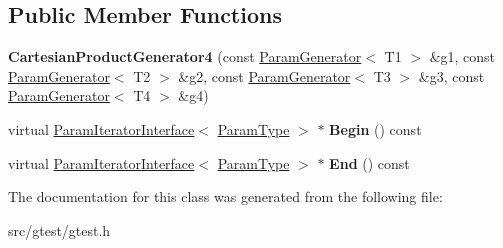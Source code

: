 \subsection*{Public Member Functions}
\begin{DoxyCompactItemize}
\item 
\mbox{\label{classtesting_1_1internal_1_1_cartesian_product_generator4_a4e4512b35f0d71f7a718ded6fe829296}} 
{\bfseries Cartesian\+Product\+Generator4} (const \mbox{\hyperlink{classtesting_1_1internal_1_1_param_generator}{Param\+Generator}}$<$ T1 $>$ \&g1, const \mbox{\hyperlink{classtesting_1_1internal_1_1_param_generator}{Param\+Generator}}$<$ T2 $>$ \&g2, const \mbox{\hyperlink{classtesting_1_1internal_1_1_param_generator}{Param\+Generator}}$<$ T3 $>$ \&g3, const \mbox{\hyperlink{classtesting_1_1internal_1_1_param_generator}{Param\+Generator}}$<$ T4 $>$ \&g4)
\item 
\mbox{\label{classtesting_1_1internal_1_1_cartesian_product_generator4_a2d47d5c0544eeaaff895ba41f825ae3f}} 
virtual \mbox{\hyperlink{classtesting_1_1internal_1_1_param_iterator_interface}{Param\+Iterator\+Interface}}$<$ \mbox{\hyperlink{classstd_1_1tr1_1_1tuple}{Param\+Type}} $>$ $\ast$ {\bfseries Begin} () const
\item 
\mbox{\label{classtesting_1_1internal_1_1_cartesian_product_generator4_a77f18e56a5a9271a1b3b0dff381a5bd3}} 
virtual \mbox{\hyperlink{classtesting_1_1internal_1_1_param_iterator_interface}{Param\+Iterator\+Interface}}$<$ \mbox{\hyperlink{classstd_1_1tr1_1_1tuple}{Param\+Type}} $>$ $\ast$ {\bfseries End} () const
\end{DoxyCompactItemize}


The documentation for this class was generated from the following file\+:\begin{DoxyCompactItemize}
\item 
src/gtest/gtest.\+h\end{DoxyCompactItemize}
